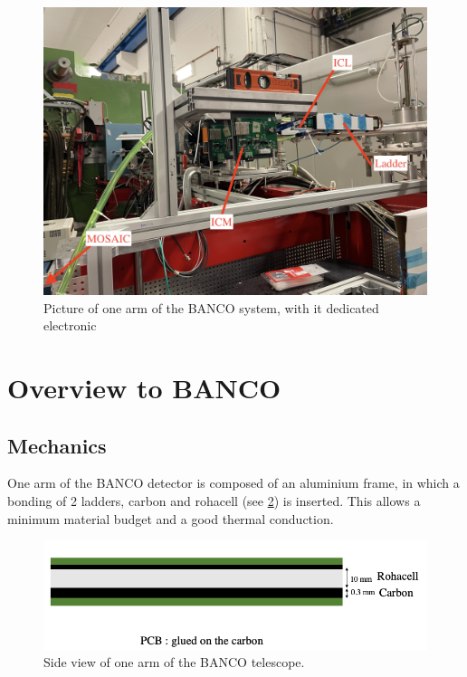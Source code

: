 \documentclass[12pt,oneside,a4]{article}
\begin{document}
\begin{figure}[h]
    \centering
        \includegraphics[scale =0.08]{figures/BANCO overview.jpg}
        \caption{Picture of one arm of the BANCO system, with it dedicated electronic}
        \label{fig:2}
    \end{figure}
    
\section{Overview to BANCO }
    \subsection{Mechanics}
    
    One arm of the BANCO detector is composed of an aluminium frame, in which a bonding of 2 ladders, carbon and rohacell (see \ref{fig:1})  is inserted. This allows a minimum 
    material budget and a good thermal conduction. 
    
    \begin{figure}[h]
        \centering
        \includegraphics[scale =0.5]{figures/BANCO SIDE VIWE.png}
        \caption{Side view of one arm of the BANCO telescope.}
        \label{fig:1}
    \end{figure}
    
\end{document}
